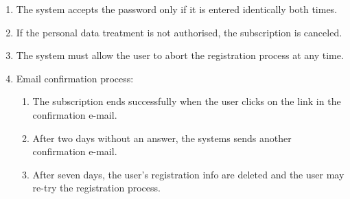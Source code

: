 \begin{enumerate}
    \item The system accepts the password only if it is entered identically both times. \label{f-psw2}
    \item If the personal data treatment is not authorised, the subscription is canceled. \label{f-dataTreat}
    \item The system must allow the user to abort the registration process at any time.
    \item Email confirmation process:
    \begin{enumerate}
	    \item The subscription ends successfully when the user clicks on the link in the confirmation e-mail.
	    \item After two days without an answer, the systems sends another confirmation e-mail.
	    \item After seven days, the user's registration info are deleted and the user may re-try the registration process.  \label{f-confirm}
	\end{enumerate}
\end{enumerate}
